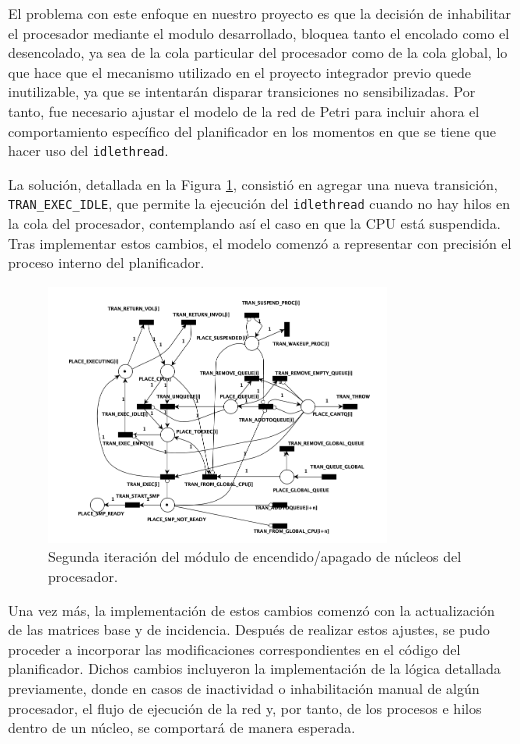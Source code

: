 El problema con este enfoque en nuestro proyecto es que la decisión de inhabilitar el procesador mediante el modulo desarrollado, bloquea tanto el encolado como el desencolado, ya sea de la cola particular del procesador como de la cola global, lo que hace que el mecanismo utilizado en el proyecto integrador previo quede inutilizable, ya que se intentarán disparar transiciones no sensibilizadas. Por tanto, fue necesario ajustar el modelo de la red de Petri para incluir ahora el comportamiento específico del planificador en los momentos en que se tiene que hacer uso del \texttt{idlethread}.\par

La solución, detallada en la Figura \ref{fig:cpu-on-off-2nd-iteration}, consistió en agregar una nueva transición, \verb|TRAN_EXEC_IDLE|, que permite la ejecución del \texttt{idlethread} cuando no hay hilos en la cola del procesador, contemplando así el caso en que la CPU está suspendida. Tras implementar estos cambios, el modelo comenzó a representar con precisión el proceso interno del planificador.\par

\begin{figure}[H]
    \centering
    \vspace*{0.1in}
    \includegraphics[width=0.8\textwidth]{./images/cpuOnOff-2nd-iteration.png}
    \caption{Segunda iteración del módulo de encendido/apagado de núcleos del procesador.}
    \label{fig:cpu-on-off-2nd-iteration}
\end{figure}

Una vez más, la implementación de estos cambios comenzó con la actualización de las matrices base y de incidencia. Después de realizar estos ajustes, se pudo proceder a incorporar las modificaciones correspondientes en el código del planificador. Dichos cambios incluyeron la implementación de la lógica detallada previamente, donde en casos de inactividad o inhabilitación manual de algún procesador, el flujo de ejecución de la red y, por tanto, de los procesos e hilos dentro de un núcleo, se comportará de manera esperada.\par

